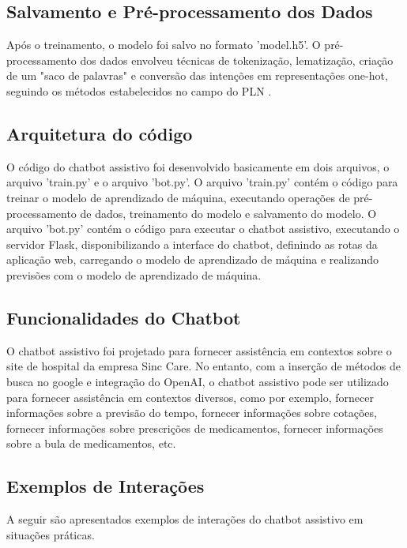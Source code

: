 \documentclass[conference]{IEEEtran}
\begin{document}
\subsection{Salvamento e Pré-processamento dos Dados}
Após o treinamento, o modelo foi salvo no formato 'model.h5'. 
O pré-processamento dos dados envolveu técnicas de tokenização, lematização, criação de um "saco de palavras" e 
conversão das intenções em representações one-hot, 
seguindo os métodos estabelecidos no campo do PLN \cite{Manning1999}.

\subsection {Arquitetura do código}
O código do chatbot assistivo foi desenvolvido basicamente em dois arquivos,
o arquivo 'train.py' e o arquivo 'bot.py'.
O arquivo 'train.py' contém o código para treinar o modelo de aprendizado de máquina,
executando operações de pré-processamento de dados, treinamento do modelo e salvamento do modelo.
O arquivo 'bot.py' contém o código para executar o chatbot assistivo,
executando o servidor Flask, disponibilizando a interface do chatbot, definindo as rotas da aplicação web,
carregando o modelo de aprendizado de máquina e realizando previsões com o modelo de aprendizado de máquina.

\subsection{Funcionalidades do Chatbot}
O chatbot assistivo foi projetado para fornecer assistência em contextos sobre o site de hospital da empresa Sinc Care.
No entanto, com a inserção de métodos de busca no google e integração do OpenAI, o chatbot assistivo pode ser utilizado
para fornecer assistência em contextos diversos, como por exemplo, fornecer informações sobre a previsão do tempo,
fornecer informações sobre cotações, fornecer informações sobre prescrições de medicamentos, fornecer informações sobre
a bula de medicamentos, etc. 

\subsection{Exemplos de Interações}
A seguir são apresentados exemplos de interações do chatbot assistivo em situações práticas.
\end{document}
